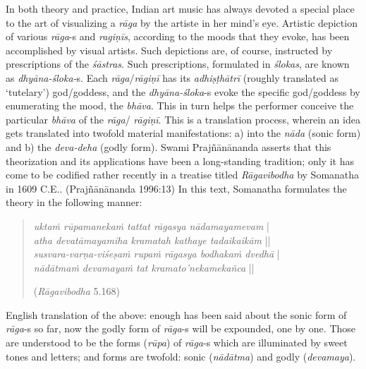 In both theory and practice, Indian art music has always devoted a special place to the art of visualizing a \textsl{rāga} by the artiste in her mind’s eye. Artistic depiction of various \textsl{rāga}-s and \textsl{ragiṇīs}, according to the moods that they evoke, has been accomplished by visual artists. Such depictions are, of course, instructed by prescriptions of the \textsl{śāstras}. Such prescriptions, formulated in \textsl{ślokas}, are known as \textsl{dhyāna-śloka-}s. Each \textsl{rāga}/\textsl{rāgiṇī} has its \textsl{adhiṣṭhātrī} (roughly translated as ‘tutelary’) god/goddess, and the \textsl{dhyāna-śloka}-s evoke the specific god/goddess by enumerating the mood, the \textsl{bhāva}. This in turn helps the performer conceive the particular \textsl{bhāva} of the \textsl{rāga}/ \textsl{rāgiṇī}. This is a translation process, wherein an idea gets translated into twofold material manifestations: a) into the \textsl{nāda} (sonic form) and b) the \textsl{deva-deha} (godly form). Swami Prajñānānanda asserts that this theorization and its applications have been a long-standing tradition; only it has come to be codified rather recently in a treatise titled \textsl{Rāgavibodha} by Somanatha in 1609 C.E.. (Prajñānānanda 1996:13) In this text, Somanatha formulates the theory in the following manner:

\newpage

\begin{quote}
\textsl{uktaṁ rūpamanekaṁ tattat rāgasya nādamayamevam} |\\
\textsl{atha devatāmayamiha kramatah kathaye tadaikaikām} ||\\
\textsl{susvara-varṇa-viśeṣaṁ rupaṁ rāgasya bodhakaṁ dvedhā} |\\
\textsl{nādātmaṁ devamayaṁ tat kramato’nekamekañca} || 

\hfill (\textsl{Rāgavibodha} 5.168)
\end{quote}

English translation of the above: enough has been said about the sonic form of \textsl{rāga}-s so far, now the godly form of \textsl{rāga}-s will be expounded, one by one. Those are understood to be the forms (\textsl{rūpa}) of \textsl{rāga}-s which are illuminated by sweet tones and letters; and forms are twofold: sonic (\textsl{nādātma}) and godly (\textsl{devamaya}). 

